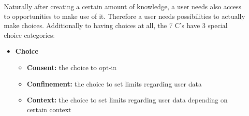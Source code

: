 Naturally after creating a certain amount of knowledge, a user needs
also access to opportunities to make use of it. Therefore a user needs
possibilities to actually make choices. Additionally to having choices at
all, the 7 C's have 3 special choice categories:

\begin{itemize}

\item
  \textbf{Choice}
  \begin{itemize}
  \item
    \textbf{Consent:} the choice to opt-in
  \item
    \textbf{Confinement:} the choice to set limits regarding user data
  \item
    \textbf{Context:} the choice to set limits regarding user data
    depending on certain context
  \end{itemize}

\end{itemize}

